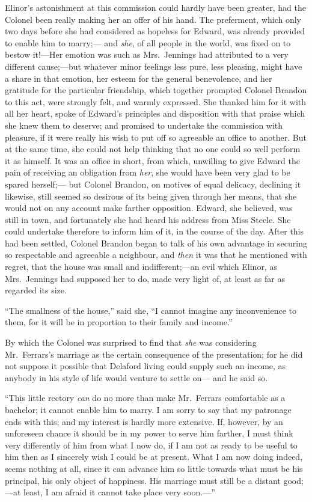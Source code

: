 Elinor's astonishment at this commission could
hardly have been greater, had the Colonel been really
making her an offer of his hand.  The preferment,
which only two days before she had considered as hopeless
for Edward, was already provided to enable him to marry;---%
and \emph{she}, of all people in the world, was fixed on to
bestow it!---Her emotion was such as Mrs.\ Jennings had
attributed to a very different cause;---but whatever minor
feelings less pure, less pleasing, might have a share
in that emotion, her esteem for the general benevolence,
and her gratitude for the particular friendship,
which together prompted Colonel Brandon to this act,
were strongly felt, and warmly expressed.  She thanked him
for it with all her heart, spoke of Edward's principles and
disposition with that praise which she knew them to deserve;
and promised to undertake the commission with pleasure,
if it were really his wish to put off so agreeable an office
to another.  But at the same time, she could not help
thinking that no one could so well perform it as himself.
It was an office in short, from which, unwilling to give
Edward the pain of receiving an obligation from \emph{her},
she would have been very glad to be spared herself;---%
but Colonel Brandon, on motives of equal delicacy,
declining it likewise, still seemed so desirous of its being
given through her means, that she would not on any account
make farther opposition.  Edward, she believed, was still in
town,
and fortunately she had heard his address from Miss Steele.
She could undertake therefore to inform him of it,
in the course of the day.  After this had been settled,
Colonel Brandon began to talk of his own advantage
in securing so respectable and agreeable a neighbour,
and \emph{then} it was that he mentioned with regret, that the
house was small and indifferent;---an evil which Elinor,
as Mrs.\ Jennings had supposed her to do, made very light of,
at least as far as regarded its size.

``The smallness of the house,'' said she,
``I cannot imagine any inconvenience to them,
for it will be in proportion to their family and income.''

By which the Colonel was surprised to find that \emph{she}
was considering Mr.\ Ferrars's marriage as the certain
consequence of the presentation; for he did not suppose it
possible that Delaford living could supply such an income,
as anybody in his style of life would venture to settle on---%
and he said so.

``This little rectory \emph{can} do no more than make Mr.\ Ferrars
comfortable as a bachelor; it cannot enable him to marry.
I am sorry to say that my patronage ends with this;
and my interest is hardly more extensive.  If, however,
by an unforeseen chance it should be in my power to serve
him farther, I must think very differently of him
from what I now do, if I am not as ready to be useful
to him then as I sincerely wish I could be at present.
What I am now doing indeed, seems nothing at all,
since it can advance him so little towards what must
be his principal, his only object of happiness.
His marriage must still be a distant good;---at least,
I am afraid it cannot take place very soon.---''

